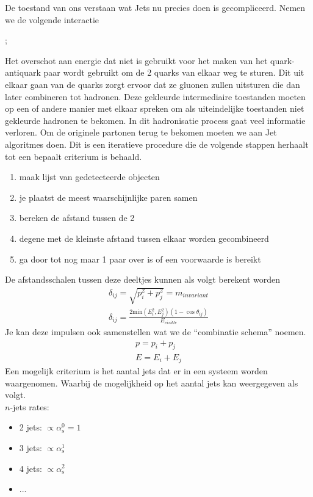 \documentclass[../main.tex]{subfiles}
\begin{document}
De toestand van ons verstaan wat Jets nu precies doen is gecompliceerd. Nemen we de volgende interactie\\
\begin{center}
;
\end{center}
Het overschot aan energie dat niet is gebruikt voor het maken van het quark-antiquark paar wordt gebruikt om de 2 quarks van elkaar weg te sturen. Dit uit elkaar gaan van de quarks zorgt ervoor dat ze gluonen zullen uitsturen die dan later combineren tot hadronen. Deze gekleurde intermediaire toestanden moeten op een of andere manier met elkaar spreken om als uiteindelijke toestanden niet gekleurde hadronen te bekomen. In dit hadronisatie process gaat veel informatie verloren. Om de originele partonen terug te bekomen moeten we aan Jet algoritmes doen. Dit is een iteratieve procedure die de volgende stappen herhaalt tot een bepaalt criterium is behaald.
\begin{enumerate}
    \item maak lijst van gedetecteerde objecten
    \item je plaatst de meest waarschijnlijke paren samen
    \item bereken de afstand tussen de 2
    \item degene met de kleinste afstand tussen elkaar worden gecombineerd
    \item ga door tot nog maar 1 paar over is of een voorwaarde is bereikt
\end{enumerate}
De afstandsschalen tussen deze deeltjes kunnen als volgt berekent worden
\begin{equation}
    \begin{aligned}
        \label{eq:jet_alg_afstand}
        \delta_{ij} = \sqrt{p_i^2+p_j^2} = m_{invariant}\\
        \delta_{ij} = \frac{2\text{min}(E_i^2,E_j^2)(1-\cos\theta_{ij})}{E_{visible}} 
    \end{aligned}
\end{equation}
Je kan deze impulsen ook samenstellen wat we de ``combinatie schema'' noemen.
\begin{equation}
    \begin{aligned}
        \label{eq:comb_scheme}
        p=p_i+p_j\\
        E=E_i+E_j
    \end{aligned}
\end{equation}
Een mogelijk criterium is het aantal jets dat er in een systeem worden waargenomen. Waarbij de mogelijkheid op het aantal jets kan weergegeven als volgt.\\
$n$-jets rates:
\begin{itemize}
    \item 2 jets: $\propto \alpha_s^0 = 1$
    \item 3 jets: $\propto \alpha_s^1$
    \item 4 jets: $\propto \alpha_s^2$
    \item ...
\end{itemize}
\end{document}
